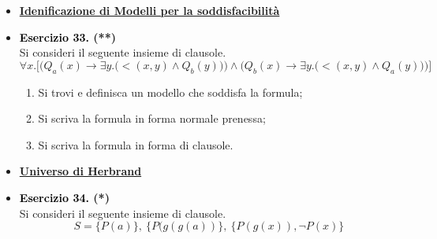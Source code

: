 \documentclass[a4paper,10pt]{article}
\begin{document}
    {\normalsize
    \begin{itemize}[label=, leftmargin=0pt]
    

    
    

    \item \textbf{\underline{Idenificazione di Modelli per la soddisfacibilità}}
    
    \item \textbf{\textcolor{black}{Esercizio 33.} (**)} \\ 	
    Si consideri il seguente insieme di clausole.
    $$\forall x.\bigg[\bigg(Q_a(x) \rightarrow \exists y.\bigg(<(x,y)\land Q_b(y)\bigg)\bigg) \land \bigg( Q_b(x)\rightarrow \exists y.\bigg( <(x,y)\land Q_a(y) \bigg) \bigg)\bigg]$$
    
    \begin{enumerate}
    \item Si trovi e definisca un modello che soddisfa la formula;
    \item Si scriva la formula in forma normale prenessa;
    \item Si scriva la formula in forma di clausole.\\[0.1cm]
    \end{enumerate}

    

    
    \item \textbf{\underline{Universo di Herbrand}}

    \item \textbf{\textcolor{black}{Esercizio 34.} (*)} \\ 	
    Si consideri il seguente insieme di clausole.
    $$ S = \{P(a)\},\ \{P(g(g(a))\},\ \{P(g(x)),\lnot P(x)\} $$
    

\end{itemize}}
\end{document}
